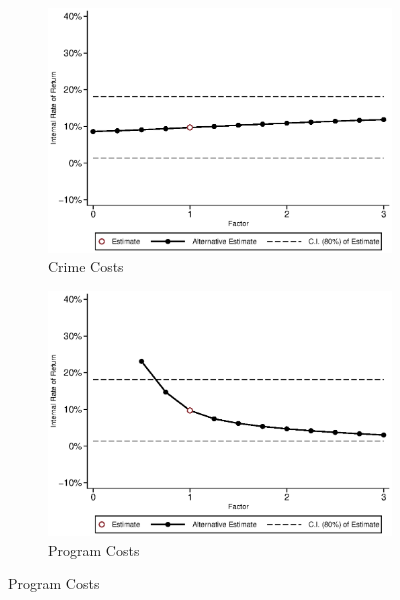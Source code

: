 \begin{figure}[H]
\ContinuedFloat	
	\begin{subfigure}[h]{0.8\textwidth}
	\centering
	\caption{Crime Costs} \label{fig:irrf_crime_f1}
	\includegraphics[width=\textwidth]{AppOutput/Sensitivity/irrf_crime_f1.eps}
	\end{subfigure}
	
	\begin{subfigure}[h]{0.8\textwidth}
	\centering
	\caption{Program Costs} \label{fig:irrf_costs_f1}
	\includegraphics[width=\textwidth]{AppOutput/Sensitivity/irrf_costs_f1.eps}
	\end{subfigure}
\end{figure}
	
